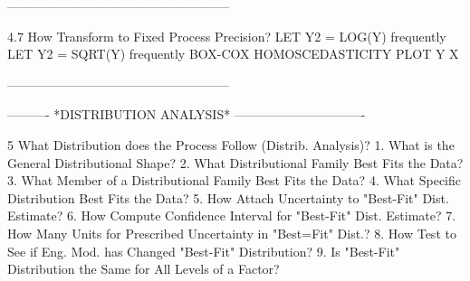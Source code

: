 -----------------------------------------------------
 
4.7
How Transform to Fixed Process Precision?
      LET Y2 = LOG(Y)      frequently
      LET Y2 = SQRT(Y)     frequently
      BOX-COX HOMOSCEDASTICITY PLOT Y X
 
-----------------------------------------------------
 
 
 
 
 
 
 
 
 
 
 
 
 
 
 
 
 
 
 
 
 
 
 
 
 
 
 
 
 
 
 
 
 
 
 
 
 
 
 
 
 
 
 
 
 
 
 
 
 
 
 
 
 
 
 
 
 
 
 
 
 
 
 
 
 
 
 
 
 
 
 
 
 
 
 
 
 
 
 
 
 
 
 
 
----------  *DISTRIBUTION ANALYSIS*  -------------------------------
 
5
What Distribution does the Process Follow (Distrib. Analysis)?
   1. What is the General Distributional Shape?
   2. What Distributional Family Best Fits the Data?
   3. What Member of a Distributional Family Best Fits the Data?
   4. What Specific Distribution Best Fits the Data?
   5. How Attach Uncertainty to "Best-Fit" Dist. Estimate?
   6. How Compute Confidence Interval for "Best-Fit" Dist. Estimate?
   7. How Many Units for Prescribed Uncertainty in "Best=Fit" Dist.?
   8. How Test to See if Eng. Mod. has Changed "Best-Fit" Distribution?
   9. Is "Best-Fit" Distribution the Same for All Levels of a Factor?
 
